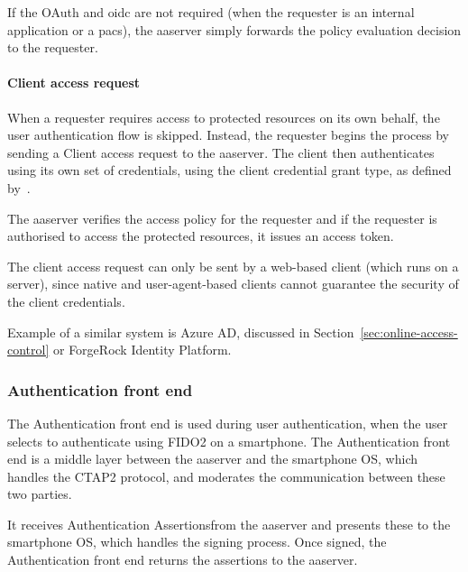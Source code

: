 If the OAuth and \acrshort{oidc} are not required (when the requester is an internal application or a \acrshort{pacs}), the \acrshort{aaserver} simply forwards the policy evaluation decision to the requester.

\paragraph{Client access request}
When a requester requires access to protected resources on its own behalf, the user authentication flow is skipped. Instead, the requester begins the process by sending a Client access request to the \acrshort{aaserver}. The client then authenticates using its own set of credentials, using the client credential grant type, as defined by~\cite{Hardt2012TheFramework}. 

The \acrshort{aaserver} verifies the access policy for the requester and if the requester is authorised to access the protected resources, it issues an access token.

The client access request can only be sent by a web-based client (which runs on a server), since native and user-agent-based clients cannot guarantee the security of the client credentials.

\bigskip \noindent
Example of a similar system is Azure AD, discussed in Section~\ref{sec:online-access-control} or ForgeRock Identity Platform\footnotemark.
% 
    
\subsubsection{Authentication front end}
The Authentication front end is used during user authentication, when the user selects to authenticate using FIDO2 on a smartphone. The Authentication front end is a middle layer between the \acrshort{aaserver} and the smartphone OS, which handles the CTAP2 protocol, and moderates the communication between these two parties.

It receives Authentication Assertions\footnotemark from the \acrshort{aaserver} and presents these to the smartphone OS, which handles the signing process. Once signed, the Authentication front end returns the assertions to the \acrshort{aaserver}.
% 


